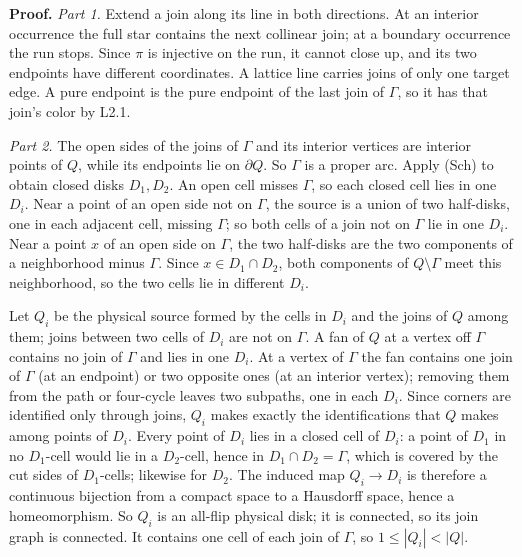 \documentclass[
  11pt,
]{article}
\begin{document}
\textbf{Proof.} \emph{Part 1.} Extend a join along its line in both
directions. At an interior occurrence the full star contains the next
collinear join; at a boundary occurrence the run stops. Since \(\pi\) is
injective on the run, it cannot close up, and its two endpoints have
different coordinates. A lattice line carries joins of only one target
edge. A pure endpoint is the pure endpoint of the last join of
\(\Gamma\), so it has that join's color by L2.1.

\emph{Part 2.} The open sides of the joins of \(\Gamma\) and its
interior vertices are interior points of \(Q\), while its endpoints lie
on \(\partial Q\). So \(\Gamma\) is a proper arc. Apply (Sch) to obtain
closed disks \(D_1,D_2\). An open cell misses \(\Gamma\), so each closed
cell lies in one \(D_i\). Near a point of an open side not on
\(\Gamma\), the source is a union of two half-disks, one in each
adjacent cell, missing \(\Gamma\); so both cells of a join not on
\(\Gamma\) lie in one \(D_i\). Near a point \(x\) of an open side on
\(\Gamma\), the two half-disks are the two components of a neighborhood
minus \(\Gamma\). Since \(x\in D_1\cap D_2\), both components of
\(Q\setminus \Gamma\) meet this neighborhood, so the two cells lie in
different \(D_i\).

Let \(Q_i\) be the physical source formed by the cells in \(D_i\) and
the joins of \(Q\) among them; joins between two cells of \(D_i\) are
not on \(\Gamma\). A fan of \(Q\) at a vertex off \(\Gamma\) contains no
join of \(\Gamma\) and lies in one \(D_i\). At a vertex of \(\Gamma\)
the fan contains one join of \(\Gamma\) (at an endpoint) or two opposite
ones (at an interior vertex); removing them from the path or four-cycle
leaves two subpaths, one in each \(D_i\). Since corners are identified
only through joins, \(Q_i\) makes exactly the identifications that \(Q\)
makes among points of \(D_i\). Every point of \(D_i\) lies in a closed
cell of \(D_i\): a point of \(D_1\) in no \(D_1\)-cell would lie in a
\(D_2\)-cell, hence in \(D_1\cap D_2=\Gamma\), which is covered by the
cut sides of \(D_1\)-cells; likewise for \(D_2\). The induced map
\(Q_i\to D_i\) is therefore a continuous bijection from a compact space
to a Hausdorff space, hence a homeomorphism. So \(Q_i\) is an all-flip
physical disk; it is connected, so its join graph is connected. It
contains one cell of each join of \(\Gamma\), so \(1\le|Q_i|<|Q|\).
\end{document}
